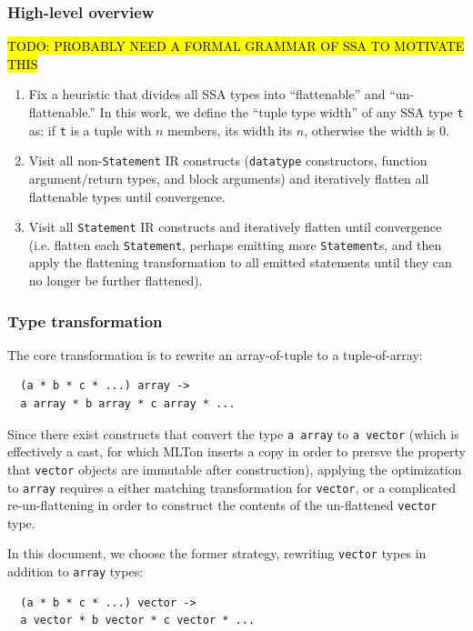 \documentclass[leqno,11pt]{article}
\begin{document}
\subsubsection{High-level overview}

\hl{TODO: PROBABLY NEED A FORMAL GRAMMAR OF SSA TO MOTIVATE THIS}

\begin{enumerate}
\item Fix a heuristic that divides all SSA types into ``flattenable'' and
  ``un-flattenable.'' In this work, we define the ``tuple type width'' of any
  SSA type \texttt{t} as: if \texttt{t} is a tuple with $n$ members, its width
  its $n$, otherwise the width is 0.

\item Visit all non-\texttt{Statement} IR constructs (\texttt{datatype}
  constructors, function argument/return types, and block arguments) and
  iteratively flatten all flattenable types until convergence.

\item Visit all \texttt{Statement} IR constructs and iteratively flatten until
  convergence (i.e. flatten each \texttt{Statement}, perhaps emitting more
  \texttt{Statement}s, and then apply the flattening transformation to all
  emitted statements until they can no longer be further flattened).

\end{enumerate}

\subsubsection{Type transformation}
The core transformation is to rewrite an array-of-tuple to a tuple-of-array:
\begin{verbatim}
  (a * b * c * ...) array ->
  a array * b array * c array * ...
\end{verbatim}
Since there exist constructs that convert the type \texttt{a array} to \texttt{a
  vector} (which is effectively a cast, for which MLTon inserts a copy in order
to prersve the property that \texttt{vector} objects are immutable after
construction), applying the optimization to \texttt{array} requires a either
matching transformation for \texttt{vector}, or a complicated re-un-flattening
in order to construct the contents of the un-flattened \texttt{vector} type.

In this document, we choose the former strategy, rewriting \texttt{vector} types
in addition to \texttt{array} types:
\begin{verbatim}
  (a * b * c * ...) vector ->
  a vector * b vector * c vector * ...
\end{verbatim}
\end{document}
